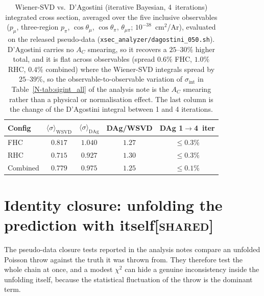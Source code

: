 \documentclass[11pt,a4paper]{article}
\newcommand{\noteref}[2]{#1~\ref{N-#2} of the analysis note}
\newcommand{\scopetag}[1]{\hfill{\normalfont\small\textsc{[#1]}}}
\begin{document}
\begin{table}[H]
  \centering
  \caption{Wiener-SVD vs.\ D'Agostini (iterative Bayesian, 4~iterations) integrated
    cross section, averaged over the five inclusive observables ($p_\mu$, three-region $p_\pi$,
    $\cos\theta_\mu$, $\cos\theta_\pi$, $\theta_{\mu\pi}$; $10^{-38}$~cm$^2$/Ar), evaluated on the
    released pseudo-data (\texttt{xsec\_analyzer/dagostini\_050.sh}). D'Agostini carries no $A_C$ smearing, so
    it recovers a $25$--$30\%$ higher total, and it is flat across observables (spread $0.6\%$ FHC,
    $1.0\%$ RHC, $0.4\%$ combined) where the Wiener-SVD integrals spread by $25$--$39\%$,
    so the observable-to-observable variation of $\sigma_\mathrm{int}$ in
    \noteref{Table}{tab:sigint_all} is the $A_C$ smearing rather than a physical or
    normalisation effect. The last column is the change of the D'Agostini integral between
    1 and 4 iterations.}
  \label{tab:dagostini}
  \begin{tabular}{lcccc}
    \toprule
    Config & $\langle\sigma\rangle_\mathrm{WSVD}$ & $\langle\sigma\rangle_\mathrm{DAg}$
      & DAg/WSVD & DAg 1$\to$4~iter \\
    \midrule
    FHC      & $0.817$ & $1.040$ & $1.27$ & $\le0.3\%$ \\
    RHC      & $0.715$ & $0.927$ & $1.30$ & $\le0.3\%$ \\
    Combined & $0.779$ & $0.975$ & $1.25$ & $\le0.1\%$ \\
    \bottomrule
  \end{tabular}
\end{table}


\section[Identity closure: unfolding the prediction with itself]{Identity closure: unfolding the prediction with itself\scopetag{shared}}
\label{sec:identity}

The pseudo-data closure tests reported in the analysis notes compare an unfolded Poisson throw against
the truth it was thrown from. They therefore test the whole chain at once, and a modest
$\chi^2$ can hide a genuine inconsistency inside the unfolding itself, because the
statistical fluctuation of the throw is the dominant term.
\end{document}
